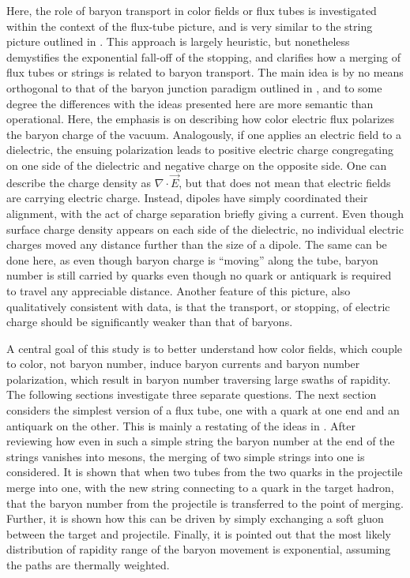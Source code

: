 \documentclass[aps, prc, 12pt, nofootinbib, showpacs, superscriptaddress, tightenlines, groupedaddress]{revtex4-2}
\begin{document}
Here, the role of baryon transport in color fields or flux tubes is investigated within the context of the flux-tube picture, and is very similar to the string picture outlined in \cite{Vance:1997th}. This approach is largely heuristic, but nonetheless demystifies the exponential fall-off of the stopping, and clarifies how a merging of flux tubes or strings is related to baryon transport. The main idea is by no means orthogonal to that of the baryon junction paradigm outlined in \cite{Kharzeev:1996sq}, and to some degree the differences with the ideas presented here are more semantic than operational. Here, the emphasis is on describing how color electric flux polarizes the baryon charge of the vacuum. Analogously, if one applies an electric field to a dielectric, the ensuing polarization leads to positive electric charge congregating on one side of the dielectric and negative charge on the opposite side. One can describe the charge density as $\nabla\cdot\vec{E}$, but that does not mean that electric fields are carrying electric charge. Instead, dipoles have simply coordinated their alignment, with the act of charge separation briefly giving a current. Even though surface charge density appears on each side of the dielectric, no individual electric charges moved any distance further than the size of a dipole. The same can be done here, as even though baryon charge is ``moving'' along the tube, baryon number is still carried by quarks even though no quark or antiquark is required to travel any appreciable distance. Another feature of this picture, also qualitatively consistent with data, is that the transport, or stopping, of electric charge should be significantly weaker than that of baryons.

A central goal of this study is to better understand how color fields, which couple to color, not baryon number, induce baryon currents and baryon number polarization, which result in baryon number traversing large swaths of rapidity. The following sections investigate three separate questions. The next section considers the simplest version of a flux tube, one with a quark at one end and an antiquark on the other. This is mainly a restating of the ideas in \cite{Vance:1997th}. After reviewing how even in such a simple string the baryon number at the end of the strings vanishes into mesons, the merging of two simple strings into one is considered. It is shown that when two tubes from the two quarks in the projectile merge into one, with the new string connecting to a quark in the target hadron, that the baryon number from the projectile is transferred to the point of merging. Further, it is shown how this can be driven by simply exchanging a soft gluon between the target and projectile. Finally, it is pointed out that the most likely distribution of rapidity range of the baryon movement is exponential, assuming the paths are thermally weighted.
\end{document}
